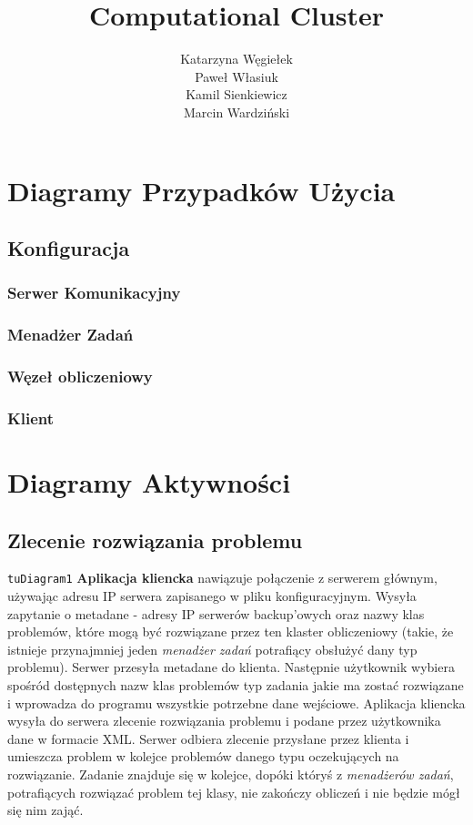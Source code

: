 \documentclass[12pt,a4paper,titlepage]{report}
\author{Katarzyna Węgiełek \\ Paweł Własiuk \\ Kamil Sienkiewicz\\ Marcin Wardziński}
\title{\textbf{Computational Cluster}}
\begin{document}
\maketitle
\tableofcontents

	\chapter{Diagramy Przypadków Użycia}
		\section{Konfiguracja}
			\subsection{Serwer Komunikacyjny}
			\subsection{Menadżer Zadań}
			\subsection{Węzeł obliczeniowy}
			\subsection{Klient}
	\chapter{Diagramy Aktywności}
		\section{Zlecenie rozwiązania problemu}
		\verb+tuDiagram1+
		\textbf{Aplikacja kliencka} nawiązuje połączenie z serwerem głównym, używając adresu IP serwera zapisanego w pliku konfiguracyjnym. Wysyła zapytanie o metadane - adresy IP serwerów backup'owych oraz nazwy klas problemów, które mogą być rozwiązane przez ten klaster obliczeniowy (takie, że istnieje przynajmniej jeden \textit{menadżer zadań} potrafiący obsłużyć dany typ problemu). Serwer przesyła metadane do klienta. Następnie użytkownik wybiera spośród dostępnych nazw klas problemów typ zadania jakie ma zostać rozwiązane i wprowadza do programu wszystkie potrzebne dane wejściowe. Aplikacja kliencka wysyła do serwera zlecenie rozwiązania problemu i podane przez użytkownika dane w formacie XML.
Serwer odbiera zlecenie przysłane przez klienta i umieszcza problem w kolejce problemów danego typu oczekujących na rozwiązanie. Zadanie znajduje się w kolejce, dopóki któryś z \textit{menadżerów zadań}, potrafiących rozwiązać problem tej klasy, nie zakończy obliczeń i nie będzie mógł się nim zająć.
\end{document}

